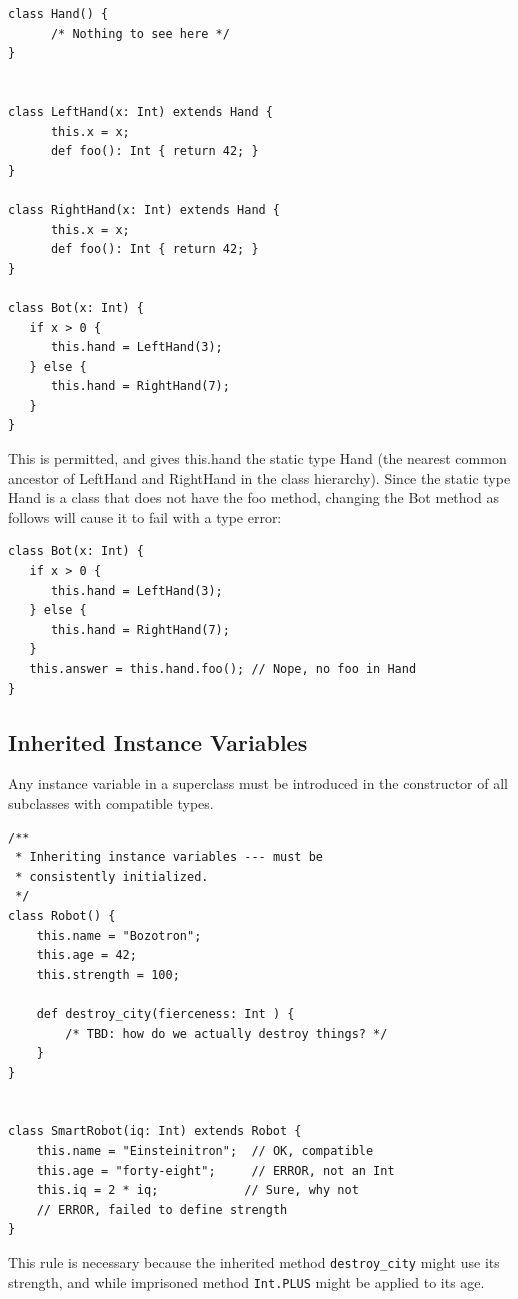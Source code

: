 \documentclass[11pt]{article}
\begin{document}
\begin{verbatim}
class Hand() {
      /* Nothing to see here */
}


class LeftHand(x: Int) extends Hand {
      this.x = x;
      def foo(): Int { return 42; }
}

class RightHand(x: Int) extends Hand {
      this.x = x; 
      def foo(): Int { return 42; }
}

class Bot(x: Int) {
   if x > 0 {
      this.hand = LeftHand(3);
   } else {
      this.hand = RightHand(7);
   }
}
\end{verbatim}

This is permitted, and gives this.hand the static type Hand (the
nearest common ancestor of LeftHand and RightHand in the class
hierarchy).   Since the static type Hand is a class that does not 
have the foo method,  changing the Bot method as follows will 
cause it to fail with a type error: 
\begin{verbatim}
class Bot(x: Int) {
   if x > 0 {
      this.hand = LeftHand(3);
   } else {
      this.hand = RightHand(7);
   }
   this.answer = this.hand.foo(); // Nope, no foo in Hand
}
\end{verbatim}

\subsection{Inherited Instance Variables}

Any instance variable in a superclass must be introduced in the
constructor of all subclasses with compatible types. 

\begin{verbatim}
/**
 * Inheriting instance variables --- must be
 * consistently initialized.
 */
class Robot() {
    this.name = "Bozotron";
    this.age = 42;
    this.strength = 100;

    def destroy_city(fierceness: Int ) {
    	/* TBD: how do we actually destroy things? */
    }
}


class SmartRobot(iq: Int) extends Robot {
    this.name = "Einsteinitron";  // OK, compatible
    this.age = "forty-eight";     // ERROR, not an Int
    this.iq = 2 * iq;            // Sure, why not
    // ERROR, failed to define strength
}
\end{verbatim}

This rule is necessary because the inherited method
\verb|destroy_city| might use its strength, and 
while imprisoned method \verb|Int.PLUS| might be applied to its age. 
\end{document}

